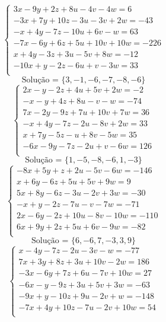 \documentclass[12pt,oneside,a4paper]{article}
\begin{document}
\vspace{\baselineskip}
\begin{equation*}
\begin{cases}
3x-9y+2z+8u-4v-4w=6 \\
-3x+7y+10z-3u-3v+2w=-43 \\
-x+4y-7z-10u+6v-w=63 \\
-7x-6y+6z+5u+10v+10w=-226 \\
x+4y-3z+3u-5v+8w=-12 \\
-10x+y-2z-6u+v-3w=33 \\
\end{cases}
\end{equation*}
\begin{equation*}
\text{Solução = }\{3,-1,-6,-7,-8,-6\}
\end{equation*}
\vspace{\baselineskip}
\begin{equation*}
\begin{cases}
2x-y-2z+4u+5v+2w=-2 \\
-x-y+4z+8u-v-w=-74 \\
7x-2y-9z+7u+10v+7w=36 \\
-x+4y-7z-2u-8v+2w=33 \\
x+7y-5z-u+8v-5w=35 \\
-6x-9y-7z-2u+v-6w=126 \\
\end{cases}
\end{equation*}
\begin{equation*}
\text{Solução = }\{1,-5,-8,-6,1,-3\}
\end{equation*}
\vspace{\baselineskip}
\begin{equation*}
\begin{cases}
-8x+5y+z+2u-5v-6w=-146 \\
x+6y-6z+5u+5v+9w=9 \\
5x+8y-6z-3u-2v+3w=-30 \\
-x+y-2z-7u-v-7w=-71 \\
2x-6y-2z+10u-8v-10w=-110 \\
6x+9y+2z+5u+6v-9w=-82 \\
\end{cases}
\end{equation*}
\begin{equation*}
\text{Solução = }\{6,-6,7,-3,3,9\}
\end{equation*}
\vspace{\baselineskip}
\begin{equation*}
\begin{cases}
x-4y-7z-2u-3v-w=-77 \\
7x+3y+8z+3u+10v-2w=186 \\
-3x-6y+7z+6u-7v+10w=27 \\
-6x-y-9z+3u+5v+3w=-63 \\
-9x+y-10z+9u-2v+w=-148 \\
-7x+4y+10z-7u-2v+10w=54 \\
\end{cases}
\end{equation*}
\end{document}
